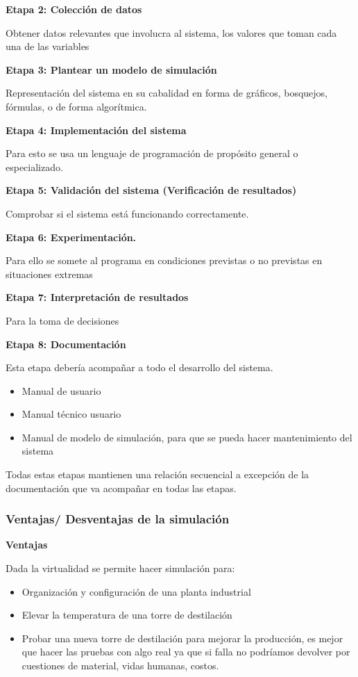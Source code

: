 \documentclass[11pt,letterpaper]{report}
\begin{document}
\textbf{Etapa 2: Colección de datos}

Obtener datos relevantes que involucra al sistema, los valores que toman cada una de las variables

\textbf{Etapa 3: Plantear un modelo de simulación}

Representación del sistema en su cabalidad en forma de gráficos, bosquejos, fórmulas, o de forma algorítmica.

\textbf{Etapa 4: Implementación del sistema}

Para esto se usa un lenguaje de programación de propósito general o especializado.

\textbf{Etapa 5: Validación del sistema (Verificación de resultados)}

Comprobar si el sistema está funcionando correctamente.

\textbf{Etapa 6: Experimentación.}

Para ello se somete al programa en condiciones previstas o no previstas en situaciones extremas

\textbf{Etapa 7: Interpretación de resultados}

Para la toma de decisiones

\textbf{Etapa 8: Documentación}

Esta etapa debería acompañar a todo el desarrollo del sistema.
\begin{itemize}[label=-]
\item Manual de usuario
\item Manual técnico usuario
\item Manual de modelo de simulación, para que se pueda hacer mantenimiento del sistema
\end{itemize}

Todas estas etapas mantienen una relación secuencial a excepción de la documentación que va acompañar en todas las etapas.

\subsubsection*{Ventajas/ Desventajas de la simulación}

\textbf{Ventajas}

Dada la virtualidad se permite hacer simulación para:
\begin{itemize}
\item Organización y configuración de una planta industrial
\item Elevar la temperatura de una torre de destilación
\item Probar una nueva torre de destilación para mejorar la producción, es mejor que hacer las pruebas con algo real ya que si falla no podríamos devolver por cuestiones de material, vidas humanas, costos.
\end{itemize}
\end{document}
